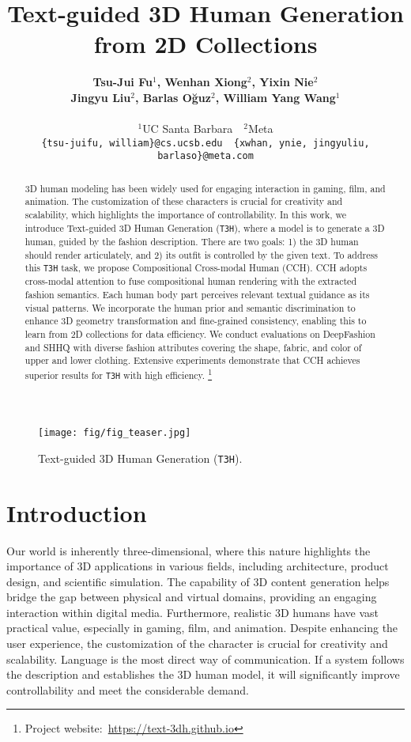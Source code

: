 \documentclass[11pt]{article}
\title{Text-guided 3D Human Generation from 2D Collections}
\author{\textbf{Tsu-Jui Fu$^\text{1}$, Wenhan Xiong$^\text{2}$, Yixin Nie$^\text{2}$}\\\textbf{Jingyu Liu$^\text{2}$, Barlas Oğuz$^\text{2}$, William Yang Wang$^\text{1}$}\\ \\$^\text{1}$UC Santa Barbara~~$^\text{2}$Meta\\{\tt \small \{tsu-juifu, william\}@cs.ucsb.edu~~\{xwhan, ynie, jingyuliu, barlaso\}@meta.com}}
\newcommand \blfootnote[1]{
    \begingroup
        \renewcommand \thefootnote{}\footnote{#1}
        \addtocounter{footnote}{-1}
        \vspace{-1ex}
    \endgroup
}
\begin{document}
\maketitle
\setlength{\abovedisplayskip}{5pt} \setlength{\belowdisplayskip}{5pt}

\begin{abstract}
3D human modeling has been widely used for engaging interaction in gaming, film, and animation. The customization of these characters is crucial for creativity and scalability, which highlights the importance of controllability. In this work, we introduce Text-guided 3D Human Generation (\texttt{T3H}), where a model is to generate a 3D human, guided by the fashion description. There are two goals: 1) the 3D human should render articulately, and 2) its outfit is controlled by the given text. To address this \texttt{T3H} task, we propose Compositional Cross-modal Human (CCH). CCH adopts cross-modal attention to fuse compositional human rendering with the extracted fashion semantics. Each human body part perceives relevant textual guidance as its visual patterns. We incorporate the human prior and semantic discrimination to enhance 3D geometry transformation and fine-grained consistency, enabling this to learn from 2D collections for data efficiency. We conduct evaluations on DeepFashion and SHHQ with diverse fashion attributes covering the shape, fabric, and color of upper and lower clothing. Extensive experiments demonstrate that CCH achieves superior results for \texttt{T3H} with high efficiency.\blfootnote{Project website:~\url{https://text-3dh.github.io}}
\end{abstract}

\begin{figure}[t]
\centering
    \texttt{[image: fig/fig\_teaser.jpg]}
    \vspace{-3.5ex}
    \caption{Text-guided 3D Human Generation (\texttt{T3H}).}
    \vspace{-2ex}
    \label{fig:teaser}
\end{figure}

\section{Introduction}
Our world is inherently three-dimensional, where this nature highlights the importance of 3D applications in various fields, including architecture, product design, and scientific simulation. The capability of 3D content generation helps bridge the gap between physical and virtual domains, providing an engaging interaction within digital media. Furthermore, realistic 3D humans have vast practical value, especially in gaming, film, and animation. Despite enhancing the user experience, the customization of the character is crucial for creativity and scalability. Language is the most direct way of communication. If a system follows the description and establishes the 3D human model, it will significantly improve controllability and meet the considerable demand.
\end{document}
